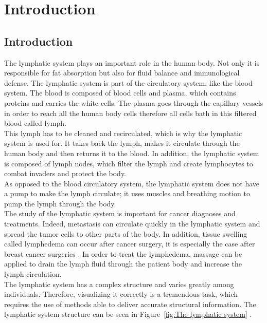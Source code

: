 
\chapter[Introduction]{Introduction}
\section{Introduction}

The lymphatic system plays an important role in the human body. Not only it is responsible for fat absorption but also for fluid balance and immunological defense. The lymphatic system is part of the circulatory system, like the blood system. The blood is composed of blood cells and plasma, which contains proteins and carries the white cells.  The plasma goes through the capillary vessels in order to reach all the human body cells therefore all cells bath in this filtered blood called lymph.  \\

This lymph has to be cleaned and recirculated, which is why the lymphatic system is used for. It takes back the lymph, makes it circulate through the human body and then returns it to the blood. In addition, the lymphatic system is composed of lymph nodes, which filter the lymph and create lymphocytes to combat invaders and protect the body. \\

As opposed to the blood circulatory system, the lymphatic system does not have a pump to make the lymph circulate; it uses muscles and breathing motion to pump the lymph through the body. \\

The study of the lymphatic system is important for cancer diagnoses and treatments. Indeed, metastasis can circulate quickly in the lymphatic system and spread the tumor cells to other parts of the body. In addition, tissue swelling called lymphedema can occur after cancer surgery, it is especially the case after breast cancer surgeries \cite{marshall_near-infrared_2010}. In order to treat the lymphedema, massage can be applied to drain the lymph fluid through the patient body and increase the lymph circulation. \\

The lymphatic system has a complex structure and varies greatly among individuals. Therefore, visualizing it correctly is a tremendous task, which requires the use of methods able to deliver accurate structural information.  The lymphatic system structure can be seen in Figure~\ref{fig:The lymphatic system} \cite{lymphatic}.

